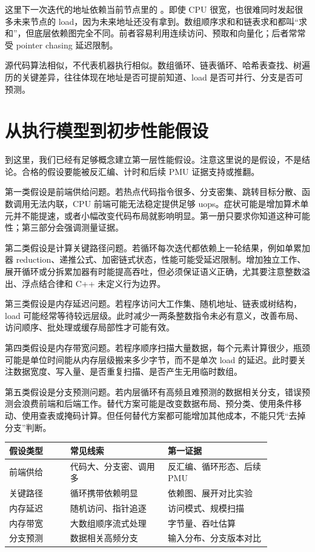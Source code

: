 这里下一次迭代的地址依赖当前节点里的 。即使 CPU 很宽，也很难同时发起很多未来节点的 load，因为未来地址还没有拿到。数组顺序求和和链表求和都叫“求和”，但底层依赖图完全不同。前者容易利用连续访问、预取和向量化；后者常常受 pointer chasing 延迟限制。

\begin{mentalmodel}
源代码算法相似，不代表机器执行相似。数组循环、链表循环、哈希表查找、树遍历的关键差异，往往体现在地址是否可提前知道、load 是否可并行、分支是否可预测。
\end{mentalmodel}

\section{从执行模型到初步性能假设}

到这里，我们已经有足够概念建立第一层性能假设。注意这里说的是假设，不是结论。合格的假设要能被反汇编、计时和后续 PMU 证据支持或推翻。

第一类假设是前端供给问题。若热点代码指令很多、分支密集、跳转目标分散、函数调用无法内联，CPU 前端可能无法稳定提供足够 uops。症状可能是增加算术单元并不能提速，或者小幅改变代码布局就影响明显。第一册只要求你知道这种可能性；第三部分会强调测量证据。

第二类假设是计算关键路径问题。若循环每次迭代都依赖上一轮结果，例如单累加器 reduction、递推公式、加密链式状态，性能可能受延迟限制。增加独立工作、展开循环或分拆累加器有时能提高吞吐，但必须保证语义正确，尤其要注意整数溢出、浮点结合律和 C++ 未定义行为边界。

第三类假设是内存延迟问题。若程序访问大工作集、随机地址、链表或树结构，load 可能经常等待较远层级。此时减少一两条整数指令未必有意义，改善布局、访问顺序、批处理或缓存局部性才可能有效。

第四类假设是内存带宽问题。若程序顺序扫描大量数据，每个元素计算很少，瓶颈可能是单位时间能从内存层级搬来多少字节，而不是单次 load 的延迟。此时要关注数据宽度、写入量、是否重复扫描、是否产生无用临时数组。

第五类假设是分支预测问题。若内层循环有高频且难预测的数据相关分支，错误预测会浪费前端和后端工作。替代方案可能是改变数据布局、预分类、使用条件移动、使用查表或掩码计算。但任何替代方案都可能增加其他成本，不能只凭“去掉分支”判断。

\begin{center}
\begin{tabular}{p{0.20\linewidth}p{0.32\linewidth}p{0.34\linewidth}}
\toprule
假设类型 & 常见线索 & 第一证据 \\
\midrule
前端供给 & 代码大、分支密、调用多 & 反汇编、循环形态、后续 PMU \\
关键路径 & 循环携带依赖明显 & 依赖图、展开对比实验 \\
内存延迟 & 随机访问、指针追逐 & 访问模式、规模扫描 \\
内存带宽 & 大数组顺序流式处理 & 字节量、吞吐估算 \\
分支预测 & 数据相关高频分支 & 输入分布、分支版本对比 \\
\bottomrule
\end{tabular}
\end{center}


